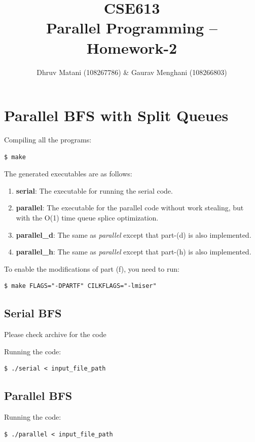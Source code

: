 \documentclass{article}
\title{CSE613\\Parallel Programming -- Homework-2}
\author{Dhruv Matani (108267786) \& Gaurav Menghani (108266803)}
\begin{document}
\maketitle

\clearpage

\tableofcontents

\clearpage

\section{Parallel BFS with Split Queues}

Compiling all the programs:
\begin{verbatim}
$ make
\end{verbatim}

The generated executables are as follows:

\begin{enumerate}
\item \textbf{serial}: The executable for running the serial code.
\item \textbf{parallel}: The executable for the parallel code without work stealing, but with the O(1) time queue splice optimization.
\item \textbf{parallel\_d}: The same as \textit{parallel} except that part-(d) is also implemented.
\item \textbf{parallel\_h}: The same as \textit{parallel} except that part-(h) is also implemented.
\end{enumerate}

To enable the modifications of part (f), you need to run:
\begin{verbatim}
$ make FLAGS="-DPARTF" CILKFLAGS="-lmiser"
\end{verbatim}


\subsection{Serial BFS}

Please check archive for the code

Running the code:
\begin{verbatim}
$ ./serial < input_file_path
\end{verbatim}

\subsection{Parallel BFS}

Running the code:
\begin{verbatim}
$ ./parallel < input_file_path
\end{verbatim}
\end{document}
